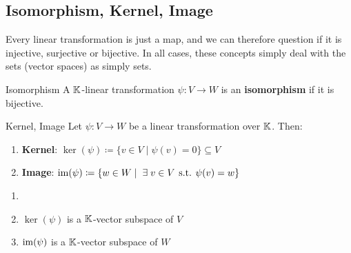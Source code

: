 \subsection{Isomorphism, Kernel, Image}
Every linear transformation is just a map, and we can therefore question if it is injective, surjective or bijective. In all cases, these concepts simply deal with the sets (vector spaces) as simply sets.

\begin{definition} {Isomorphism}
    A \(\mathbb{K}\)-linear transformation \(\psi: V \to W\) is an \textbf{isomorphism} if it is bijective.
\end{definition}

\begin{definition} {Kernel, Image}
    Let \(\psi: V \to W\) be a linear transformation over \(\mathbb{K}\). Then: \begin{enumerate}
        \item \textbf{Kernel}: \(\ker(\psi) \coloneqq \{v \in V \mid \psi(v) = 0\} \subseteq V\)
        \item \textbf{Image}: \(\im(\psi) \coloneqq \{w \in W \mid \exists v \in V \st \psi(v) = w\}\)
    \end{enumerate}
\end{definition}

\begin{lemma}
    \begin{enumerate}
        \item[]
        \item \(\ker(\psi)\) is a \(\mathbb{K}\)-vector subspace of \(V\)
        \item \(\mathrm{im}(\psi)\) is a \(\mathbb{K}\)-vector subspace of \(W\)
    \end{enumerate}
\end{lemma}

